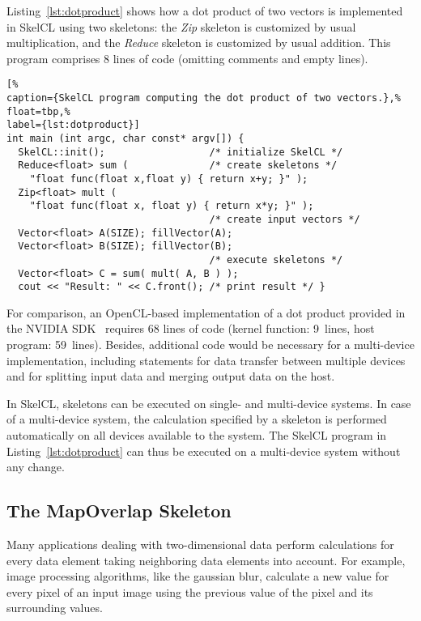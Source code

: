 Listing~\ref{lst:dotproduct} shows how a dot product of two vectors is implemented in SkelCL using two skeletons:
the \emph{Zip} skeleton is customized by usual multiplication, and the \emph{Reduce} skeleton is customized by usual addition.
This program comprises 8 lines of code (omitting comments and empty lines).
\begin{lstlisting}[%
caption={SkelCL program computing the dot product of two vectors.},%
float=tbp,%
label={lst:dotproduct}]
int main (int argc, char const* argv[]) {
  SkelCL::init();                  /* initialize SkelCL */
  Reduce<float> sum (              /* create skeletons */
    "float func(float x,float y) { return x+y; }" );
  Zip<float> mult (
    "float func(float x, float y) { return x*y; }" );
                                   /* create input vectors */
  Vector<float> A(SIZE); fillVector(A);
  Vector<float> B(SIZE); fillVector(B);
                                   /* execute skeletons */
  Vector<float> C = sum( mult( A, B ) );
  cout << "Result: " << C.front(); /* print result */ }
\end{lstlisting}
For comparison, an OpenCL-based implementation of a dot product provided in the NVIDIA SDK~\cite{CUDASDK-10} requires 68 lines of code (kernel function: 9~lines, host program: 59~lines).
Besides, additional code would be necessary for a multi-device implementation, including statements for data transfer between multiple devices and for splitting input data and merging output data on the host.

In SkelCL, skeletons can be executed on single- and multi-device systems.
In case of a multi-device system, the calculation specified by a skeleton is performed automatically on all devices available to the system.
The SkelCL program in Listing~\ref{lst:dotproduct} can thus be executed on a multi-device system without any change.

\subsection{The MapOverlap Skeleton}
Many applications dealing with two-dimensional data perform calculations for every data element taking neighboring data elements into account.
For example, image processing algorithms, like the gaussian blur, calculate a new value for every pixel of an input image using the previous value of the pixel and its surrounding values.

